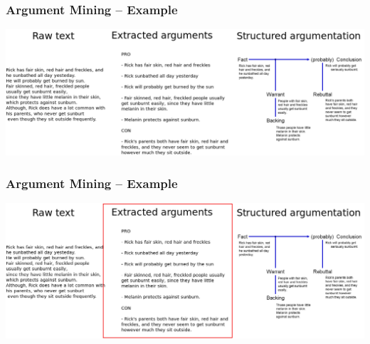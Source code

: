 \documentclass{beamer}
\begin{document}
\begin{frame}
	\frametitle{Argument Mining -- Example}
	\centering
	\includegraphics[scale=0.25]{argstruc.png}
\end{frame}


\begin{frame}
	\frametitle{Argument Mining -- Example}
	\centering
	\includegraphics[scale=0.25]{argstruc_2.png}
\end{frame}

\end{document}
